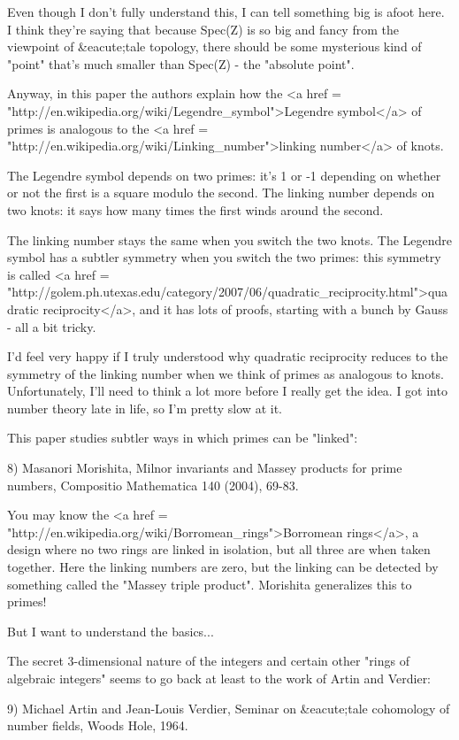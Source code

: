 Even though I don't fully understand this, I can tell something
big is afoot here.  I think they're saying that
because Spec(Z) is so big and fancy from the viewpoint of
&eacute;tale topology, there should be some mysterious kind of "point"
that's much smaller than Spec(Z) - the "absolute point".

Anyway, in this paper the authors explain how the <a href =
"http://en.wikipedia.org/wiki/Legendre_symbol">Legendre symbol</a> of
primes is analogous to the <a href =
"http://en.wikipedia.org/wiki/Linking_number">linking number</a> of
knots.

The Legendre symbol depends on two primes: it's 1 or -1 depending 
on whether or not the first is a square modulo the second.  The 
linking number depends on two knots: it says how many times the 
first winds around the second.

The linking number stays the same when you switch the two knots.  
The Legendre symbol has a subtler symmetry when you switch the 
two primes: this symmetry is called <a href = "http://golem.ph.utexas.edu/category/2007/06/quadratic_reciprocity.html">quadratic reciprocity</a>, and 
it has lots of proofs, starting with a bunch by Gauss - all a bit 
tricky.  

I'd feel very happy if I truly understood why quadratic reciprocity 
reduces to the symmetry of the linking number when we think of 
primes as analogous to knots.  Unfortunately, I'll need to think a 
lot more before I really get the idea.  I got into number theory 
late in life, so I'm pretty slow at it.  

This paper studies subtler ways in which primes can be "linked":

8) Masanori Morishita, Milnor invariants and Massey products for 
prime numbers, Compositio Mathematica 140 (2004), 69-83.

You may know the <a href =
"http://en.wikipedia.org/wiki/Borromean_rings">Borromean rings</a>, a
design where no two rings are linked in isolation, but all three are
when taken together.  Here the linking numbers are zero, but the
linking can be detected by something called the "Massey triple
product".  Morishita generalizes this to primes!

But I want to understand the basics...

The secret 3-dimensional nature of the integers and certain other 
"rings of algebraic integers" seems to go back at least to the work 
of Artin and Verdier:

9) Michael Artin and Jean-Louis Verdier, Seminar on &eacute;tale cohomology 
of number fields, Woods Hole, 1964. 

